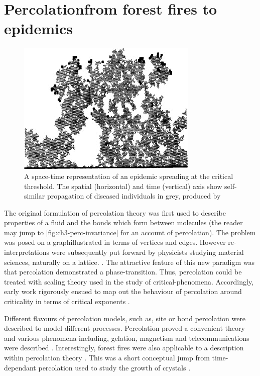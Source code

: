 \section{Percolation\textemdash from forest fires to epidemics}
\label{section:lit-rev-perc}
\begin{figure}
    \centering
    \includegraphics{chapter2/figures/perc1.jpg}
    \caption{A space-time representation of an epidemic spreading at the critical threshold. The spatial (horizontal) and time (vertical) axis show self-similar propagation of diseased individuals in grey, produced by \cite{GRASSBERGER1986273}}
    \label{fig:1d_perc_basis}
\end{figure}

The original formulation of percolation theory was first used to describe properties of a fluid and the bonds which form between molecules \cite{perco_origin} (the reader may jump to \ref{fig:ch3-perc-invariance} for an account of percolation). The problem was posed on a graph\textemdash illustrated in terms of vertices and edges. However re-interpretations were subsequently put forward by physicists studying material sciences, naturally on a lattice. \cite{Essam_1980}. The attractive feature of this new paradigm was that percolation demonstrated a phase-transition. Thus, percolation could be treated with scaling theory used in the study of critical-phenomena. Accordingly, early work rigorously ensued to map out the behaviour of percolation around criticality in terms of critical exponents \cite{STAUFFER19791}. 

Different flavours of percolation models, such as, site or bond percolation were described to model different processes. Percolation proved a convenient theory and various phenomena including, gelation, magnetism and telecommunications were described \cite{trove.nla.gov.au/work/26493727}. Interestingly, forest fires were also applicable to a description within percolation theory \cite{MacKay_1984}. This was a short conceptual jump from time-dependant percolation used to study the growth of crystals \cite{Family_1985}. 

